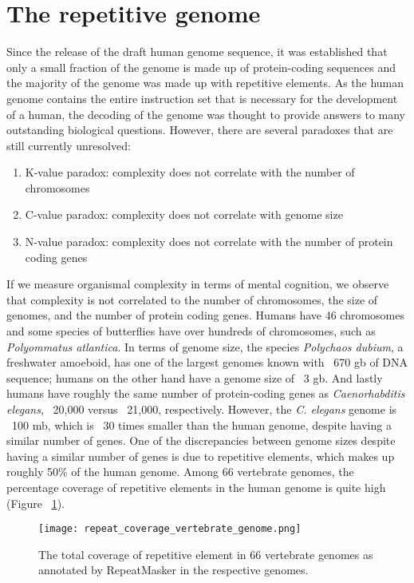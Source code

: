 \section{The repetitive genome}

Since the release of the draft human genome sequence\cite{venter2001sequence, lander2001initial}, it was established that only a small fraction of the genome is made up of protein-coding sequences and the majority of the genome was made up with repetitive elements. As the human genome contains the entire instruction set that is necessary for the development of a human, the decoding of the genome was thought to provide answers to many outstanding biological questions. However, there are several paradoxes that are still currently unresolved:

\begin{enumerate}
   \item K-value paradox: complexity does not correlate with the number of chromosomes
   \item C-value paradox: complexity does not correlate with genome size
   \item N-value paradox: complexity does not correlate with the number of protein coding genes
\end{enumerate}

If we measure organismal complexity in terms of mental cognition, we observe that complexity is not correlated to the number of chromosomes, the size of genomes, and the number of protein coding genes. Humans have 46 chromosomes and some species of butterflies have over hundreds of chromosomes, such as \textit{Polyommatus atlantica}. In terms of genome size, the species \textit{Polychaos dubium}, a freshwater amoeboid, has one of the largest genomes known with ~670 gb of DNA sequence; humans on the other hand have a genome size of ~3 gb. And lastly humans have roughly the same number of protein-coding genes as \textit{Caenorhabditis elegans}, ~20,000 versus ~21,000, respectively. However, the \textit{C. elegans} genome is ~100 mb\cite{celegans1998sequencing}, which is ~30 times smaller than the human genome, despite having a similar number of genes. One of the discrepancies between genome sizes despite having a similar number of genes is due to repetitive elements, which makes up roughly 50\% of the human genome. Among 66 vertebrate genomes, the percentage coverage of repetitive elements in the human genome is quite high (Figure ~\ref{fig:repeat_coverage_vertebrate_genome}).

\begin{figure}[h]
   \centering
   \texttt{[image: repeat\_coverage\_vertebrate\_genome.png]}
   \caption[Coverage of repetitive elements in vertebrate genomes]{The total coverage of repetitive element in 66 vertebrate genomes as annotated by RepeatMasker in the respective genomes\cite{tang2014repcoverage}.}
   \label{fig:repeat_coverage_vertebrate_genome}
\end{figure}

